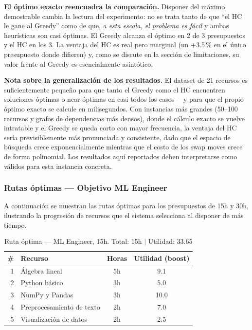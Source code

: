 \documentclass[11pt, a4paper]{article}
\begin{document}
\begin{notebox}
\textbf{El óptimo exacto reencuadra la comparación.} Disponer del máximo
demostrable cambia la lectura del experimento: no se trata tanto de que ``el
HC le gane al Greedy'' como de que, \emph{a esta escala, el problema es fácil}
y ambas heurísticas son casi óptimas. El Greedy alcanza el óptimo en 2 de 3
presupuestos y el HC en los 3. La ventaja del HC es real pero marginal
(un +3.5\,\% en el único presupuesto donde difieren) y, como se discute en la
sección de limitaciones, su valor frente al Greedy es esencialmente asintótico.
\end{notebox}

\begin{notebox}
\textbf{Nota sobre la generalización de los resultados.} El dataset de
21 recursos es suficientemente pequeño para que tanto el Greedy como el HC
encuentren soluciones óptimas o near-óptimas en casi todos los casos —y para
que el propio óptimo exacto se calcule en milisegundos. Con instancias más
grandes (50–100 recursos y grafos de dependencias más densos), donde el cálculo
exacto se vuelve intratable y el Greedy se queda corto con mayor frecuencia, la
ventaja del HC sería previsiblemente más pronunciada y consistente, dado que el
espacio de búsqueda crece exponencialmente mientras que el costo de los swap
moves crece de forma polinomial. Los resultados aquí reportados deben
interpretarse como válidos para esta instancia concreta.
\end{notebox}

\subsubsection*{Rutas óptimas — Objetivo ML Engineer}

A continuación se muestran las rutas óptimas para los presupuestos de 15h y
30h, ilustrando la progresión de recursos que el sistema selecciona al
disponer de más tiempo.

\begin{table}[H]
\centering
\small
\caption{Ruta óptima — ML Engineer, 15h. Total: 15h $|$ Utilidad: 33.65}
\begin{tabular}{r l c c}
\toprule
\textbf{\#} & \textbf{Recurso} & \textbf{Horas} & \textbf{Utilidad (boost)} \\
\midrule
1 & Álgebra lineal             & 5h & 9.1  \\
2 & Python básico              & 3h & 5.0  \\
3 & NumPy y Pandas             & 3h & 10.0 \\
4 & Preprocesamiento de texto  & 2h & 7.0  \\
5 & Visualización de datos     & 2h & 2.5  \\
\bottomrule
\end{tabular}
\end{table}
\end{document}
